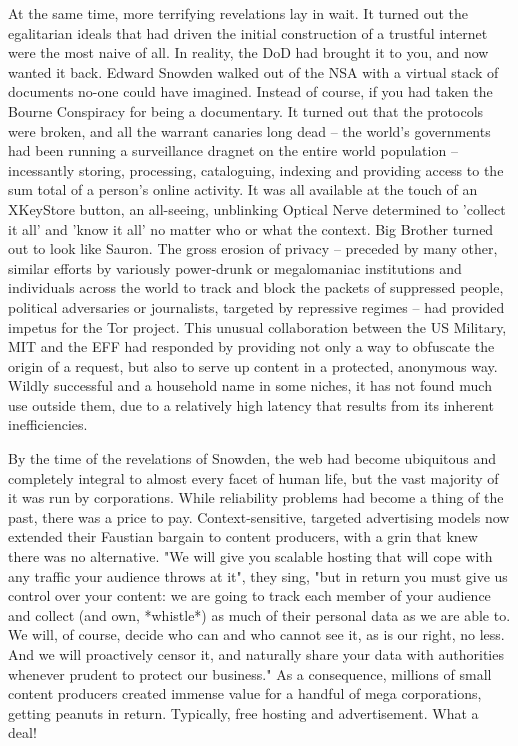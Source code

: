 At the same time, more terrifying revelations lay in wait. It turned out the egalitarian ideals that had driven the initial construction of a trustful internet were the most naive of all. In reality, the DoD had brought it to you, and now wanted it back. Edward Snowden walked out of the NSA with a virtual stack of documents no-one could have imagined. Instead of course, if you had taken the Bourne Conspiracy for being a documentary. It turned out that the protocols were broken, and all the warrant canaries long dead -- the world's governments had been running a surveillance dragnet on the entire world population -- incessantly storing, processing, cataloguing, indexing and providing access to the sum total of a person's online activity. It was all available at the touch of an XKeyStore button, an all-seeing, unblinking Optical Nerve determined to 'collect it all' and 'know it all' no matter who or what the context. Big Brother turned out to look like Sauron.
The gross erosion of privacy – preceded by many other, similar efforts by variously power-drunk or megalomaniac institutions and individuals across the world to track and block the packets of suppressed people, political adversaries or journalists, targeted by repressive regimes – had provided impetus for the Tor project. This unusual collaboration between the US Military, MIT and the EFF had responded by providing not only a way to obfuscate the origin of a request, but also to serve up content in a protected, anonymous way. Wildly successful and a household name in some niches, it has not found much use outside them, due to a relatively high latency that results from its inherent inefficiencies.

By the time of the revelations of Snowden, the web had become ubiquitous and completely integral to almost every facet of human life, but the vast majority of it was run by corporations. While reliability problems had become a thing of the past, there was a price to pay. Context-sensitive, targeted advertising models now extended their Faustian bargain to content producers, with a grin that knew there was no alternative. "We will give you scalable hosting that will cope with any traffic your audience throws at it", they sing, "but in return you must give us control over your content: we are going to track each member of your audience and collect (and own, *whistle*) as much of their personal data as we are able to. We will, of course, decide who can and who cannot see it, as is our right, no less. And we will proactively censor it, and  naturally share your data with authorities whenever prudent to protect our business." As a consequence, millions of small content producers created immense value for a handful of mega corporations, getting peanuts in return. Typically, free hosting and advertisement. What a deal!

